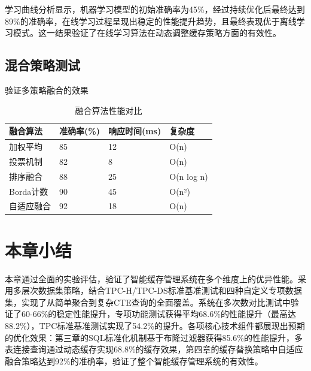 学习曲线分析显示，机器学习模型的初始准确率为45\%，经过持续优化后最终达到89\%的准确率，在线学习过程呈现出稳定的性能提升趋势，且最终表现优于离线学习模式。这一结果验证了在线学习算法在动态调整缓存策略方面的有效性。

\subsection{混合策略测试}

验证多策略融合的效果

\begin{table}[!htb]
    \caption{融合算法性能对比}
    \label{table6_10}
    \centering
    \begin{tabular}{p{3cm}p{3cm}p{3cm}p{3cm}}
        \hline
        融合算法 & 准确率(\%) & 响应时间(ms) & 复杂度 \\
        \hline
        加权平均 & 85 & 12 & O(n) \\
        投票机制 & 82 & 8 & O(n) \\
        排序融合 & 88 & 25 & O(n log n) \\
        Borda计数 & 90 & 45 & O(n²) \\
        自适应融合 & 92 & 18 & O(n) \\
        \hline
    \end{tabular}
\end{table}

\section{本章小结}

本章通过全面的实验评估，验证了智能缓存管理系统在多个维度上的优异性能。采用多层次数据集策略，结合TPC-H/TPC-DS标准基准测试和四种自定义专项数据集，实现了从简单聚合到复杂CTE查询的全面覆盖。系统在多次数对比测试中验证了60-66\%的稳定性能提升，专项功能测试获得平均68.6\%的性能提升（最高达88.2\%），TPC标准基准测试实现了54.2\%的提升。各项核心技术组件都展现出预期的优化效果：第三章的SQL标准化机制基于布隆过滤器获得85.6\%的性能提升，多表连接查询通过动态缓存实现68.8\%的缓存效果，第四章的缓存替换策略中自适应融合策略达到92\%的准确率，验证了整个智能缓存管理系统的有效性。